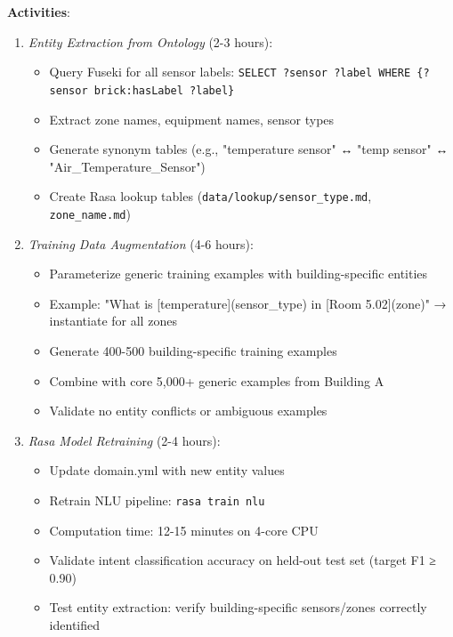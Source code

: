 \documentclass[acmlarge]{acmart}
\begin{document}
\textbf{Activities}:
\begin{enumerate}
    \item \textit{Entity Extraction from Ontology} (2-3 hours):
    \begin{itemize}
        \item Query Fuseki for all sensor labels: \texttt{SELECT ?sensor ?label WHERE \{?sensor brick:hasLabel ?label\}}
        \item Extract zone names, equipment names, sensor types
        \item Generate synonym tables (e.g., "temperature sensor" ↔ "temp sensor" ↔ "Air\_Temperature\_Sensor")
        \item Create Rasa lookup tables (\texttt{data/lookup/sensor\_type.md}, \texttt{zone\_name.md})
    \end{itemize}
    
    \item \textit{Training Data Augmentation} (4-6 hours):
    \begin{itemize}
        \item Parameterize generic training examples with building-specific entities
        \item Example: "What is [temperature](sensor\_type) in [Room 5.02](zone)" → instantiate for all zones
        \item Generate 400-500 building-specific training examples
        \item Combine with core 5,000+ generic examples from Building A
        \item Validate no entity conflicts or ambiguous examples
    \end{itemize}
    
    \item \textit{Rasa Model Retraining} (2-4 hours):
    \begin{itemize}
        \item Update domain.yml with new entity values
        \item Retrain NLU pipeline: \texttt{rasa train nlu}
        \item Computation time: 12-15 minutes on 4-core CPU
        \item Validate intent classification accuracy on held-out test set (target F1 ≥ 0.90)
        \item Test entity extraction: verify building-specific sensors/zones correctly identified
    \end{itemize}
\end{enumerate}
\end{document}
